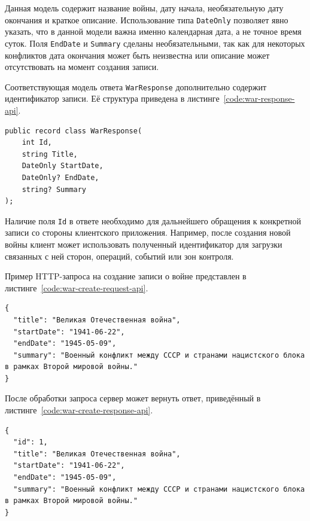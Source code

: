 Данная модель содержит название войны, дату начала, необязательную дату окончания и краткое описание. Использование типа \texttt{DateOnly} позволяет явно указать, что в данной модели важна именно календарная дата, а не точное время суток. Поля \texttt{EndDate} и \texttt{Summary} сделаны необязательными, так как для некоторых конфликтов дата окончания может быть неизвестна или описание может отсутствовать на момент создания записи.

Соответствующая модель ответа \texttt{WarResponse} дополнительно содержит идентификатор записи. Её структура приведена в листинге~\ref{code:war-response-api}.

\begin{code}
\label{code:war-response-api}
\vspace{-0.75cm}
\begin{verbatim}
public record class WarResponse(
    int Id,
    string Title,
    DateOnly StartDate,
    DateOnly? EndDate,
    string? Summary
);
\end{verbatim}
\end{code}

Наличие поля \texttt{Id} в ответе необходимо для дальнейшего обращения к конкретной записи со стороны клиентского приложения. Например, после создания новой войны клиент может использовать полученный идентификатор для загрузки связанных с ней сторон, операций, событий или зон контроля.

Пример HTTP-запроса на создание записи о войне представлен в листинге~\ref{code:war-create-request-api}.

\begin{code}
\label{code:war-create-request-api}
\vspace{-0.75cm}
\begin{verbatim}
{
  "title": "Великая Отечественная война",
  "startDate": "1941-06-22",
  "endDate": "1945-05-09",
  "summary": "Военный конфликт между СССР и странами нацистского блока в рамках Второй мировой войны."
}
\end{verbatim}
\end{code}

После обработки запроса сервер может вернуть ответ, приведённый в листинге~\ref{code:war-create-response-api}.

\begin{code}
\label{code:war-create-response-api}
\vspace{-0.75cm}
\begin{verbatim}
{
  "id": 1,
  "title": "Великая Отечественная война",
  "startDate": "1941-06-22",
  "endDate": "1945-05-09",
  "summary": "Военный конфликт между СССР и странами нацистского блока в рамках Второй мировой войны."
}
\end{verbatim}
\end{code}

